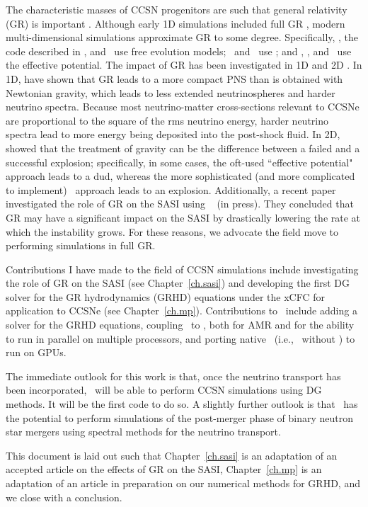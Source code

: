 The characteristic masses of CCSN progenitors are such that general relativity
(GR) is important \citep[e.g., see][]{lmt2001}.
Although early 1D simulations included full GR
\citep[e.g.,][]{mw1966}, modern multi-dimensional simulations approximate
GR to some degree.
Specifically, \zelmani, the code described in
\citet{ktk2016}, and \nadafld\ use free evolution models;
\cocov\ and \gmunu\ use \xcfc;
and \fornax, \chimera, and \flashx\ use the effective potential.
The impact of GR has been investigated in 1D \citep{bdm2001,lmm2012}
and 2D \citep{mjm2012,oc2018}.
In 1D, \citet{bdm2001} have shown that GR leads to a more compact PNS than is
obtained with Newtonian gravity, which leads to less extended neutrinospheres
and harder neutrino spectra.
Because most neutrino-matter cross-sections relevant to CCSNe are proportional to
the square of the rms neutrino energy, harder neutrino spectra lead to more
energy being deposited into the post-shock fluid.
In 2D, \citet{mjm2012} showed that the treatment of gravity
can be the difference between a failed and a successful explosion;
specifically, in some cases, the oft-used
``effective potential" approach \citep{mdj2006} leads to a dud, whereas
the more sophisticated (and more complicated to implement) \xcfc\ approach
leads to an explosion.
Additionally, a recent paper investigated the role of GR on the SASI
using \thornado\ \citep{dem2023} (in press).
They concluded that GR may have a significant impact on the SASI by drastically
lowering the rate at which the instability grows.
For these reasons, we advocate the field move to performing simulations
in full GR.

Contributions I have made to the field of CCSN simulations
include investigating the role of GR
on the SASI (see Chapter~\ref{ch.sasi}) and developing the first DG solver
for the GR hydrodynamics (GRHD) equations under the xCFC
for application to CCSNe (see Chapter~\ref{ch.mp}).
Contributions to \thornado\ include adding a solver for the GRHD equations,
coupling \thornado\ to \amrex, both for AMR and for the ability to run
in parallel on multiple processors,
and porting native \thornado\ (i.e., \thornado\ without \amrex)
to run on GPUs.

The immediate outlook for this work is that, once the neutrino transport
has been incorporated, \thornado\ will be able to perform CCSN simulations
using DG methods.
It will be the first code to do so.
A slightly further outlook is that \thornado\ has the potential to perform
simulations of the post-merger phase of binary neutron star mergers
using spectral methods for the neutrino transport.

This document is laid out such that Chapter~\ref{ch.sasi} is an adaptation
of an accepted article on the effects of GR on the SASI,
Chapter~\ref{ch.mp} is an adaptation of an article in preparation on our
numerical methods for GRHD,
and we close with a conclusion.

